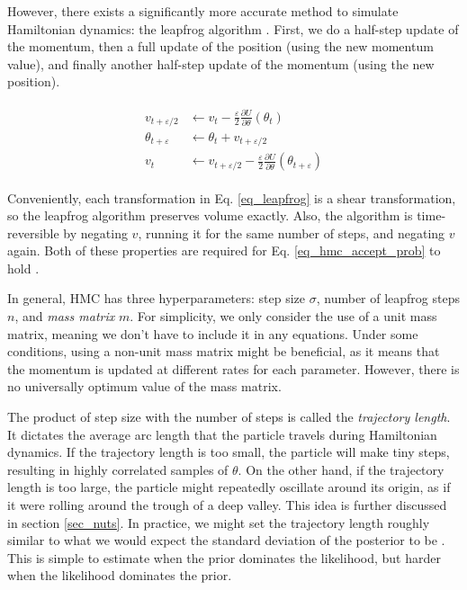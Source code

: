 \documentclass[12pt]{article}
\begin{document}
{However, there exists a significantly more accurate method to simulate Hamiltonian dynamics: the leapfrog algorithm \cite{hmc}. First, we do a half-step update of the momentum, then a full update of the position (using the new momentum value), and finally another half-step update of the momentum (using the new position).

\begin{align}
\begin{split}
v_{t+\varepsilon/2} &\leftarrow v_t - \frac{\varepsilon}{2} \frac{\partial U}{\partial \theta}(\theta_t) \\
\theta_{t+\varepsilon} &\leftarrow \theta_t + v_{t+\varepsilon/2} \\
v_t &\leftarrow v_{t+\varepsilon/2} - \frac{\varepsilon}{2} \frac{\partial U}{\partial \theta}(\theta_{t+\varepsilon})
\end{split}
\label{eq_leapfrog}
\end{align}

Conveniently, each transformation in Eq. \ref{eq_leapfrog} is a shear transformation, so the leapfrog algorithm preserves volume exactly. Also, the algorithm is time-reversible by negating $v$, running it for the same number of steps, and negating $v$ again. Both of these properties are required for Eq. \ref{eq_hmc_accept_prob} to hold \cite{hmc}.

In general, HMC has three hyperparameters: step size $\sigma$, number of leapfrog steps $n$, and \textit{mass matrix} $m$. For simplicity, we only consider the use of a unit mass matrix, meaning we don't have to include it in any equations. Under some conditions, using a non-unit mass matrix might be beneficial, as it means that the momentum is updated at different rates for each parameter. However, there is no universally optimum value of the mass matrix.

The product of step size with the number of steps is called the \textit{trajectory length}. It dictates the average arc length that the particle travels during Hamiltonian dynamics. If the trajectory length is too small, the particle will make tiny steps, resulting in highly correlated samples of $\theta$. On the other hand, if the trajectory length is too large, the particle might repeatedly oscillate around its origin, as if it were rolling around the trough of a deep valley. This idea is further discussed in section \ref{sec_nuts}. In practice, we might set the trajectory length roughly similar to what we would expect the standard deviation of the posterior to be \cite{bnn_posterior}. This is simple to estimate when the prior dominates the likelihood, but harder when the likelihood dominates the prior.

}
\end{document}
